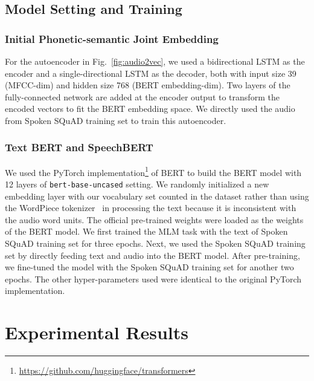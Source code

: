\documentclass[a4paper]{article}
\begin{document}
\subsection{Model Setting and Training}
\label{ssec:model}
\vspace{-5pt}

\subsubsection{Initial Phonetic-semantic Joint Embedding}
\label{ssec:expsse}
\vspace{-5pt}

For the autoencoder in Fig.~\ref{fig:audio2vec}, we used a bidirectional LSTM as the encoder and a single-directional LSTM as the decoder, both with input size 39 (MFCC-dim) and hidden size 768 (BERT embedding-dim). Two layers of the fully-connected network are added at the encoder output to transform the encoded vectors to fit the BERT embedding space. We directly used the audio from Spoken SQuAD training set to train this autoencoder.

\vspace{-5pt}
\subsubsection{Text BERT and SpeechBERT}
\label{ssec:expbert}
\vspace{-5pt}

We used the PyTorch implementation\footnote{\label{pytorch}\url{https://github.com/huggingface/transformers}} of BERT to build the BERT model with 12 layers of \texttt{bert-base-uncased} setting. We randomly initialized a new embedding layer with our vocabulary set counted in the dataset rather than using the WordPiece tokenizer~\cite{wu2016} in processing the text because it is inconsistent with the audio word units. The official pre-trained weights were loaded as the weights of the BERT model. We first trained the MLM task with the text of Spoken SQuAD training set for three epochs. 
Next, we used the Spoken SQuAD training set by directly feeding text and audio into the BERT model. 
After pre-training, we fine-tuned the model with the Spoken SQuAD training set for another two epochs. The other hyper-parameters used were identical to the original PyTorch implementation.
 
\vspace{-5pt}
\section{Experimental Results}
\label{sec:expresults}
\end{document}
